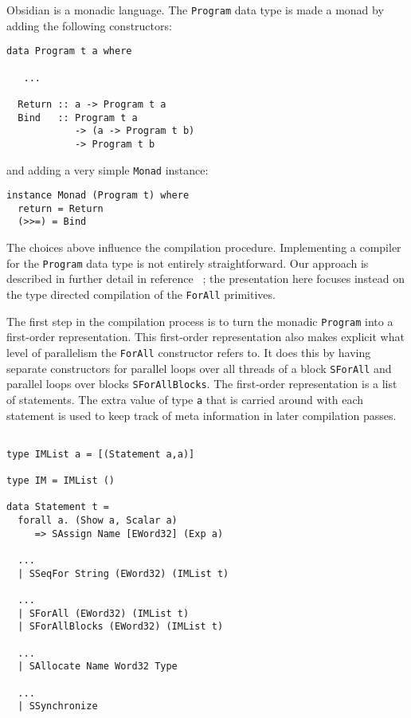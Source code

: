 Obsidian is a monadic language. The {\tt Program} 
data type is made a monad by adding the following constructors: 

\begin{small} 
\begin{Verbatim}[samepage=true] 
data Program t a where
 
   ... 
 
  Return :: a -> Program t a
  Bind   :: Program t a 
            -> (a -> Program t b) 
            -> Program t b
\end{Verbatim} 
\end{small} 
 
and adding a very simple {\tt Monad} instance:

\begin{small} 
\begin{verbatim} 
instance Monad (Program t) where
  return = Return
  (>>=) = Bind
\end{verbatim} 
\end{small} 

The choices above influence the compilation procedure. Implementing a compiler 
for the {\tt Program} data type is not entirely straightforward. Our approach 
is described in further detail in reference ~\cite{BB}; the presentation 
here focuses instead on the type directed compilation of the {\tt ForAll} 
primitives.  


The first step in the compilation process is to turn the monadic {\tt Program}
into a first-order representation. This first-order representation also makes 
explicit what level of parallelism the {\tt ForAll} constructor refers to. 
It does this by having separate constructors for parallel loops over 
all threads of a block {\tt SForAll} and parallel loops over blocks 
{\tt SForAllBlocks}. The first-order representation is a list of statements. 
The extra value of type {\tt a} that is carried around with each statement 
is used to keep track of meta information in later compilation passes. 

\begin{small}
\begin{Verbatim}[samepage=true]

type IMList a = [(Statement a,a)]

type IM = IMList ()

data Statement t =
  forall a. (Show a, Scalar a) 
     => SAssign Name [EWord32] (Exp a)
  
  ... 
  | SSeqFor String (EWord32) (IMList t)
 
  ... 
  | SForAll (EWord32) (IMList t) 
  | SForAllBlocks (EWord32) (IMList t)
   
  ... 
  | SAllocate Name Word32 Type
 
  ... 
  | SSynchronize

\end{Verbatim} 
\end{small}

